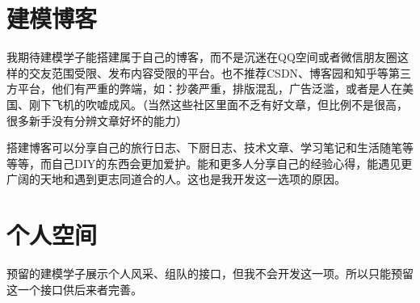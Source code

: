 \documentclass[lang=cn,hazy,screen,blue,14pt]{elegantnote}
\begin{document}
\section{建模博客}

我期待建模学子能搭建属于自己的博客，而不是沉迷在QQ空间或者微信朋友圈这样的交友范围受限、发布内容受限的平台。也不推荐CSDN、博客园和知乎等第三方平台，他们有严重的弊端，如：抄袭严重，排版混乱，广告泛滥，或者是人在美国、刚下飞机的吹嘘成风。（当然这些社区里面不乏有好文章，但比例不是很高，很多新手没有分辨文章好坏的能力）

搭建博客可以分享自己的旅行日志、下厨日志、技术文章、学习笔记和生活随笔等等等，而自己DIY的东西会更加爱护。能和更多人分享自己的经验心得，能遇见更广阔的天地和遇到更志同道合的人。这也是我开发这一选项的原因。

\section{个人空间}

预留的建模学子展示个人风采、组队的接口，但我不会开发这一项。所以只能预留这一个接口供后来者完善。
\end{document}
